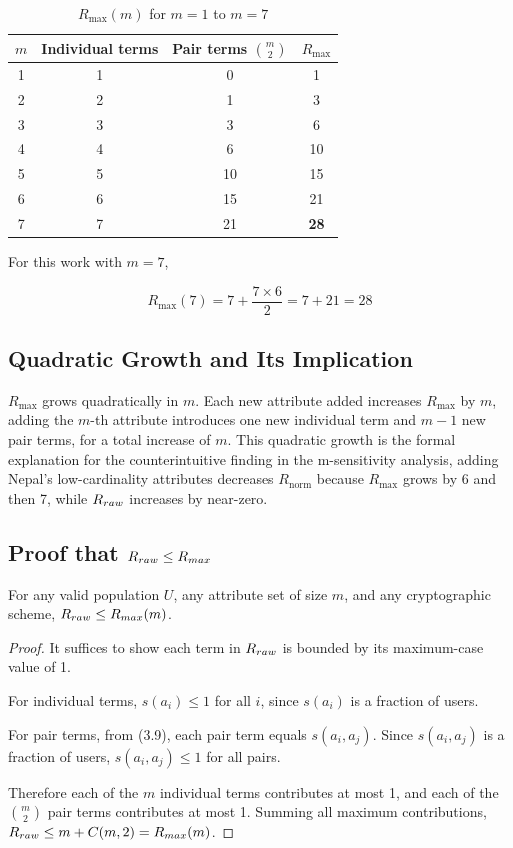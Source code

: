 \begin{table}[H]
\centering
\caption{$R_{\mathrm{max}}(m)$ for $m = 1$ to $m = 7$}
\label{tab:r_max}
\begin{tabular}{cccc}
\toprule
$m$ & Individual terms & Pair terms $\binom{m}{2}$ &
$R_{\mathrm{max}}$ \\
\midrule
1 & 1 & 0  & 1  \\
2 & 2 & 1  & 3  \\
3 & 3 & 3  & 6  \\
4 & 4 & 6  & 10 \\
5 & 5 & 10 & 15 \\
6 & 6 & 15 & 21 \\
7 & 7 & 21 & \textbf{28} \\
\bottomrule
\end{tabular}
\end{table}

For this work with $m = 7$,

\begin{equation}
R_{\mathrm{max}}(7) = 7 + \frac{7 \times 6}{2} = 7 + 21 = 28
\end{equation}

\subsection{Quadratic Growth and Its Implication}

$R_{\mathrm{max}}$ grows quadratically in $m$. Each new
attribute added increases $R_{\mathrm{max}}$ by $m$,
adding the $m$-th attribute introduces one new individual
term and $m-1$ new pair terms, for a total increase of
$m$. This quadratic growth is the formal explanation for
the counterintuitive finding in the m-sensitivity analysis,
adding Nepal's low-cardinality attributes decreases
$R_{\mathrm{norm}}$ because $R_{\mathrm{max}}$ grows by
6 and then 7, while $R_{raw}$ increases by near-zero.

\subsection{Proof that $R_{raw} \leq R_{max}$}

\begin{theorem}
For any valid population $U$, any attribute set of size
$m$, and any cryptographic scheme,
$R_{raw} \leq R_{max}(m)$.
\end{theorem}

\begin{proof}
It suffices to show each term in $R_{raw}$ is bounded by
its maximum-case value of 1.

For individual terms, $s(a_i) \leq 1$ for all $i$,
since $s(a_i)$ is a fraction of users.

For pair terms, from (3.9),
each pair term equals $s(a_i, a_j)$. Since
$s(a_i, a_j)$ is a fraction of users,
$s(a_i, a_j) \leq 1$ for all pairs.

Therefore each of the $m$ individual terms contributes
at most 1, and each of the $\binom{m}{2}$ pair terms
contributes at most 1. Summing all maximum contributions,
$R_{raw} \leq m + C(m,2) = R_{max}(m)$.
\end{proof}

